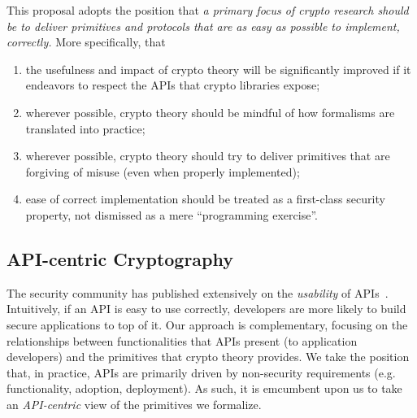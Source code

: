 This proposal adopts the position that \emph{a primary focus of crypto research
should be to deliver primitives and protocols that are as easy as possible to
implement, correctly.}  More specifically, that
\begin{enumerate}
  \item the usefulness and impact of crypto theory will be significantly
    improved if it endeavors to respect the APIs that crypto libraries expose;

  \item wherever possible, crypto theory should be mindful of how
    formalisms are translated into practice;

  \item wherever possible, crypto theory should try to deliver
    primitives that are forgiving of misuse (even when properly implemented);


  \item ease of correct implementation should be treated as a first-class
    security property, not dismissed as a mere ``programming exercise''.
\end{enumerate}


\subsection{API-centric Cryptography}
The security community has published extensively on the \emph{usability} of
APIs~\cite{ABF+}. 
Intuitively, if an API is easy to use correctly, developers are more
likely to build secure applications to top of it.  
%
Our approach is complementary, focusing on the relationships between
functionalities that APIs present (to application developers) and the primitives
that crypto theory provides. We take the position that, in practice, APIs are
primarily driven by non-security requirements (e.g. functionality, adoption,
deployment).
%
As such, it is emcumbent upon us to take an \emph{API-centric} view of the
primitives we formalize.


